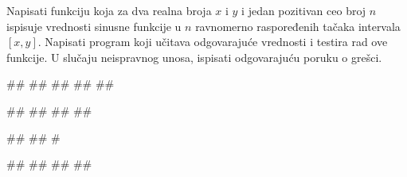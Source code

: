 \begin{Exercise}[label=FUN_22] 
Napisati funkciju 
koja za dva realna broja $x$ i $y$ i jedan pozitivan ceo broj $n$
ispisuje vrednosti sinusne funkcije u $n$ ravnomerno raspoređenih
tačaka intervala $[x,y]$.  Napisati program koji učitava odgovarajuće 
vrednosti i testira rad ove funkcije.
U slučaju neispravnog unosa, ispisati odgovarajuću poruku o grešci. 

\begin{miditest}
\begin{upotreba}{1}
#\naslovInt#
##
##
##
##
\end{upotreba}
\end{miditest}
\begin{miditest}
\begin{upotreba}{2}
#\naslovInt#
##
##
##
\end{upotreba}
\end{miditest}

\begin{miditest}
\begin{upotreba}{3}
#\naslovInt#
##
#
\end{upotreba}
\end{miditest}
\begin{miditest}
\begin{upotreba}{1}
#\naslovInt#
##
##
##
\end{upotreba}
\end{miditest}


\end{Exercise}
\ifresenja 
\begin{Answer}[ref=FUN_22]
\end{Answer} 
\fi



